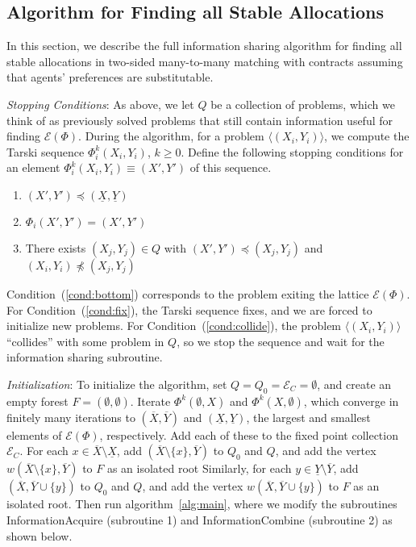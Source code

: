 \documentclass[11pt,reqno]{amsart}
\theoremstyle{definition}
\numberwithin{equation}{section}
\newcommand{\ol}{\overline}
\newcommand{\ul}{\underline}
\newcommand{\lag}{\langle}
\newcommand{\rag}{\rangle}
\newcommand{\fix}{\mathcal{E}}
\newcommand{\peq}{\preceq}
\newcommand{\acto}{Q_0}
\newcommand{\act}{Q}
\newcommand{\forest}{F}
\newcommand{\fixfind}{\mathcal{E}_C}
\newcommand{\topx}{\ol{X}}
\newcommand{\topy}{\ol{Y}}
\newcommand{\botx}{\ul{X}}
\newcommand{\boty}{\ul{Y}}
\begin{document}
\subsection{Algorithm for Finding all Stable Allocations} \label{section:algostable}

In this section, we describe the full information sharing algorithm for finding all stable allocations in two-sided many-to-many matching with contracts assuming that agents' preferences are substitutable.

\emph{Stopping Conditions}:
As above, we let $\act$ be a collection of problems, which we think of as previously solved problems that still contain information useful for finding $\fix(\Phi)$. 
During the algorithm, for a problem $\lag (X_i, Y_i) \rag $, we compute the Tarski sequence $\Phi_i^k(X_i,Y_i)$, $k \geq 0$. 
Define the following stopping conditions for an element $ \Phi_i^k(X_i,Y_i) \equiv (X', Y')$ of this sequence.
\begin{enumerate}
\item $(X',Y') \peq (\botx, \boty)$ \label{cond:bottom}
\item $\Phi_i(X',Y') = (X',Y')$ \label{cond:fix}
\item There exists $(X_j,Y_j) \in \act$ with $(X',Y') \peq (X_j,Y_j)$ and $(X_i,Y_i) \not \peq (X_j,Y_j)$ \label{cond:collide}
\end{enumerate}

Condition~(\ref{cond:bottom}) corresponds to the problem exiting the lattice $\fix(\Phi)$. 
For Condition~(\ref{cond:fix}), the Tarski sequence fixes, and we are forced to initialize new problems.
For Condition~(\ref{cond:collide}), the problem $\lag (X_i, Y_i) \rag$ ``collides'' with some problem in $\act$, so we stop the sequence and wait for the information sharing subroutine.

\emph{Initialization}: To initialize the algorithm, set $\act = \acto = \fixfind = \emptyset$, and create an empty forest $\forest = (\emptyset,\emptyset)$.
Iterate $\Phi^k(\emptyset,X)$ and $\Phi^k(X, \emptyset)$, which converge in finitely many iterations to $(\topx, \topy)$ and $(\botx,\boty)$, the largest and smallest elements of $\fix(\Phi)$, respectively.
Add each of these to the fixed point collection $\fixfind$.
For each $x \in \topx \setminus \botx$, add $(\topx \setminus \{x\}, \topy)$ to $\acto$ and $\act$, and add the vertex $w(\topx \setminus \{x\}, \topy)$ to $\forest$ as an isolated root
Similarly, for each $y \in \boty \setminus \topy$, add $(\topx, \topy \cup \{y\})$ to $\acto$ and $\act$, and add the vertex $w(\topx, \topy \cup \{y\})$ to $\forest$ as an isolated root.
Then run algorithm~\ref{alg:main}, where we modify the subroutines InformationAcquire (subroutine 1) and InformationCombine (subroutine 2) as shown below.
\end{document}

